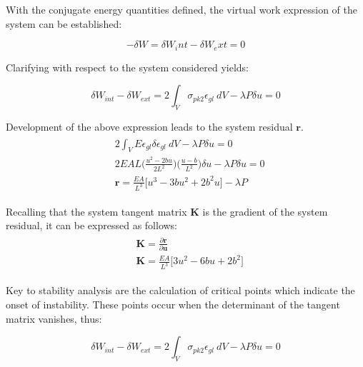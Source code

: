 With the conjugate energy quantities defined, the virtual work expression of the system can be established:

\begin{equation} 
-\delta W = \delta W_int - \delta W_ext = 0
\label{eqapp0_4}
\end{equation}

Clarifying with respect to the system considered yields:

\begin{equation} 
\delta W_{int} - \delta W_{ext} = 
2 \int_{V} \sigma_{pk2} \epsilon_{gl}
\ dV
- \lambda P \delta u = 0
\label{eqapp0_5}
\end{equation}

Development of the above expression leads to the system residual $\mathbf{r}$.
\begin{gather} 
	\begin{aligned}
		&2 \int_{V} E \epsilon_{gl} \delta \epsilon_{gl}
		\ dV
		- \lambda P \delta u = 0		
		\\
		& 2EAL \Big(\frac{u^2 - 2bu}{2L^2}\Big) \Big(\frac{u-b}{L^2}\Big)
		\delta u - \lambda P \delta u = 0	
		\\
		&\mathbf{r} = 
		\frac{EA}{L^3}
		\Big[
		u^3 -3bu^2 +2b^2u
		\Big]
		- \lambda P
		\label{eqapp0_6}
	\end{aligned}
\end{gather}

Recalling that the system tangent matrix $\mathbf{K}$ is the gradient of the system residual, it can be expressed as follows:
\begin{gather} 
	\begin{aligned}
		&\mathbf{K} = 
		\frac{\partial \mathbf{r}}{\partial \mathbf{u}}
		\\
		&
		\mathbf{K} = 
		\frac{EA}{L^3}
		\Big[
		3u^2 -6bu +2b^2
		\Big]
		\label{eqapp0_7}
	\end{aligned}
\end{gather}

Key to stability analysis are the calculation of critical points which indicate the onset of instability. These points occur when the determinant of the tangent matrix vanishes, thus:

\begin{equation} 
\delta W_{int} - \delta W_{ext} = 
2 \int_{V} \sigma_{pk2} \epsilon_{gl}
\ dV
- \lambda P \delta u = 0
\label{eqapp0_8}
\end{equation}